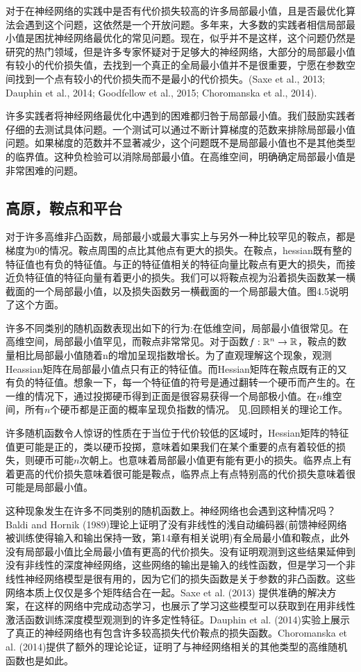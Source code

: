 对于在神经网络的实践中是否有代价损失较高的许多局部最小值，且是否最优化算法会遇到这个问题，这依然是一个开放问题。多年来，大多数的实践者相信局部最小值是困扰神经网络最优化的常见问题。现在，似乎并不是这样，这个问题仍然是研究的热门领域，但是许多专家怀疑对于足够大的神经网络，大部分的局部最小值有较小的代价损失值，去找到一个真正的全局最小值并不是很重要，宁愿在参数空间找到一个点有较小的代价损失而不是最小的代价损失。(Saxe et al., 2013; Dauphin et al., 2014; Goodfellow et al., 2015; Choromanska et al., 2014).

许多实践者将神经网络最优化中遇到的困难都归咎于局部最小值。我们鼓励实践者仔细的去测试具体问题。一个测试可以通过不断计算梯度的范数来排除局部最小值问题。如果梯度的范数并不显著减少，这个问题既不是局部最小值也不是其他类型的临界值。这种负检验可以消除局部最小值。在高维空间，明确确定局部最小值是非常困难的问题。

\subsection{高原，鞍点和平台}
对于许多高维非凸函数，局部最小或最大事实上与另外一种比较罕见的鞍点，都是梯度为0的情况。鞍点周围的点比其他点有更大的损失。在鞍点，hessian既有整的特征值也有负的特征值。与正的特征值相关的特征向量比鞍点有更大的损失，而接近负特征值的特征向量有着更小的损失。我们可以将鞍点视为沿着损失函数某一横截面的一个局部最小值，以及损失函数另一横截面的一个局部最大值。图4.5说明了这个方面。

许多不同类别的随机函数表现出如下的行为:在低维空间，局部最小值很常见。在高维空间，局部最小值罕见，而鞍点非常常见。对于函数$f:\mathbb{R}^n \to \mathbb{R}$，鞍点的数量相比局部最小值随着n的增加呈现指数增长。为了直观理解这个现象，观测Heassian矩阵在局部最小值点只有正的特征值。而Hessian矩阵在鞍点既有正的又有负的特征值。想象一下，每一个特征值的符号是通过翻转一个硬币而产生的。在一维的情况下，通过投掷硬币得到正面是很容易获得一个局部极小值。在$n$维空间，所有$n$个硬币都是正面的概率呈现负指数的情况。
见\cite{Dauphin-et-al-NIPS2014-small},回顾相关的理论工作。

许多随机函数令人惊讶的性质在于当位于代价较低的区域时，Hessian矩阵的特征值更可能是正的，类以硬币投掷，意味着如果我们在某个重要的点有着较低的损失，则硬币可能$n$次朝上。也意味着局部最小值更有能有更小的损失。临界点上有着更高的代价损失意味着很可能是鞍点，临界点上有点特别高的代价损失意味着很可能是局部最小值。

这种现象发生在许多不同类别的随机函数上。神经网络也会遇到这种情况吗？Baldi and Hornik (1989)理论上证明了没有非线性的浅自动编码器(前馈神经网络被训练使得输入和输出保持一致，第14章有相关说明)有全局最小值和鞍点，此外没有局部最小值比全局最小值有更高的代价损失。没有证明观测到这些结果延伸到没有非线性的深度神经网络，这些网络的输出是输入的线性函数，但是学习一个非线性神经网络模型是很有用的，因为它们的损失函数是关于参数的非凸函数。这些网络本质上仅仅是多个矩阵结合在一起。Saxe et al. (2013) 提供准确的解决方案，在这样的网络中完成动态学习，也展示了学习这些模型可以获取到在用非线性激活函数训练深度模型观测到的许多定性特征。Dauphin et al. (2014)实验上展示了真正的神经网络也有包含许多较高损失代价鞍点的损失函数。Choromanska et al. (2014)提供了额外的理论论证，证明了与神经网络相关的其他类型的高维随机函数也是如此。

